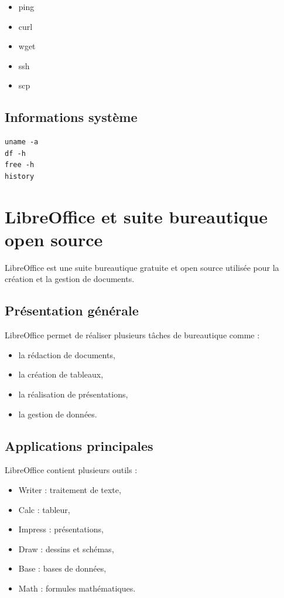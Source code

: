 \documentclass[12pt,a4paper]{report}
\begin{document}
\begin{itemize}
    \item ping
    \item curl
    \item wget
    \item ssh
    \item scp
\end{itemize}

\section{Informations système}

\begin{lstlisting}
uname -a
df -h
free -h
history
\end{lstlisting}

\chapter{LibreOffice et suite bureautique open source}

LibreOffice est une suite bureautique gratuite et open source utilisée pour la création et la gestion de documents.

\section{Présentation générale}

LibreOffice permet de réaliser plusieurs tâches de bureautique comme :
\begin{itemize}
    \item la rédaction de documents,
    \item la création de tableaux,
    \item la réalisation de présentations,
    \item la gestion de données.
\end{itemize}

\section{Applications principales}

LibreOffice contient plusieurs outils :
\begin{itemize}
    \item Writer : traitement de texte,
    \item Calc : tableur,
    \item Impress : présentations,
    \item Draw : dessins et schémas,
    \item Base : bases de données,
    \item Math : formules mathématiques.
\end{itemize}
\end{document}
